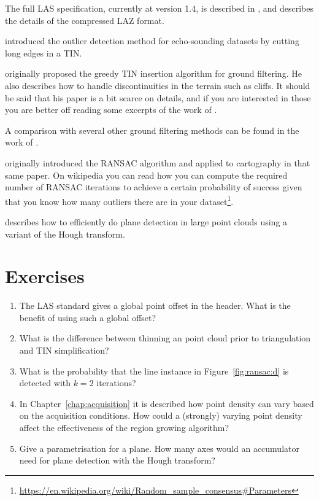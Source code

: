 The full LAS specification, currently at version 1.4, is described in \citet{LAS13}, and \citet{Isenburg13} describes the details of the compressed LAZ format.

\citet{Arge10} introduced the outlier detection method for echo-sounding datasets by cutting long edges in a TIN.

\citet{axelsson2000generation} originally proposed the greedy TIN insertion algorithm for ground filtering.
He also describes how to handle discontinuities in the terrain such as cliffs.
It should be said that his paper is a bit scarce on details, and if you are interested in those you are better off reading some excerpts of the work of \citet{Lin14}. 

A comparison with several other ground filtering methods can be found in the work of \citet{Meng10}.

\citet{Fischler81} originally introduced the RANSAC algorithm and applied to cartography in that same paper. On wikipedia you can read how you can compute the required number of RANSAC iterations to achieve a certain probability of success given that you know how many outliers there are in your dataset\footnote{\url{https://en.wikipedia.org/wiki/Random_sample_consensus\#Parameters}}.

\citet{Limberger15} describes how to efficiently do plane detection in large point clouds using a variant of the Hough transform.

%
\section{Exercises}


\begin{enumerate}
   \item The LAS standard gives a global point offset in the header. What is the benefit of using such a global offset?  
   \item What is the difference between thinning an point cloud prior to triangulation and TIN simplification?
  \item What is the probability that the line instance in Figure~\ref{fig:ransac:d} is detected with $k=2$ iterations?
  \item In Chapter~\ref{chap:acquisition} it is described how point density can vary based on the acquisition conditions. How could a (strongly) varying point density affect the effectiveness of the region growing algorithm?
  \item Give a parametrisation for a plane. How many axes would an accumulator need for plane detection with the Hough transform?

\end{enumerate}
